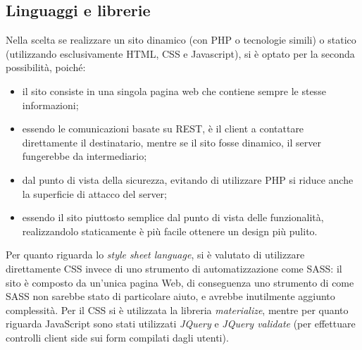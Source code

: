 \newpage
\subsection{Linguaggi e librerie}
Nella scelta se realizzare un sito dinamico (con PHP o tecnologie simili) o statico (utilizzando esclusivamente HTML, CSS e Javascript), si è optato per la seconda possibilità, poiché:
\begin{itemize}
 \item il sito consiste in una singola pagina web che contiene sempre le stesse informazioni;
 \item essendo le comunicazioni basate su REST, è il client a contattare direttamente il destinatario, mentre se il sito fosse dinamico, il server fungerebbe da intermediario;
 \item dal punto di vista della sicurezza, evitando di utilizzare PHP si riduce anche la superficie di attacco del server;
 \item essendo il sito piuttosto semplice dal punto di vista delle funzionalità, realizzandolo staticamente è più facile ottenere un design più pulito.
\end{itemize}
Per quanto riguarda lo \textit{style sheet language}, si è valutato di utilizzare direttamente CSS invece di uno strumento di automatizzazione come SASS:
il sito è composto da un'unica pagina Web, di conseguenza uno strumento di come SASS non sarebbe stato di particolare aiuto, e avrebbe inutilmente aggiunto complessità.
Per il CSS si è utilizzata la libreria \textit{materialize}, mentre per quanto riguarda JavaScript sono stati utilizzati \textit{JQuery} e \textit{JQuery validate} (per effettuare controlli client side sui form compilati dagli utenti).

